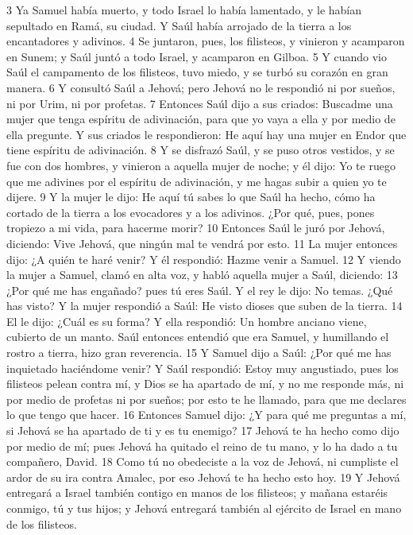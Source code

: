 {3 Ya Samuel había muerto, y todo Israel lo había lamentado, y le habían sepultado en Ramá, su ciudad. Y Saúl había arrojado de la tierra a los encantadores y adivinos. 
4 Se juntaron, pues, los filisteos, y vinieron y acamparon en Sunem; y Saúl juntó a todo Israel, y acamparon en Gilboa.
5 Y cuando vio Saúl el campamento de los filisteos, tuvo miedo, y se turbó su corazón en gran manera.
6 Y consultó Saúl a Jehová; pero Jehová no le respondió ni por sueños, ni por Urim, ni por profetas.
7 Entonces Saúl dijo a sus criados: Buscadme una mujer que tenga espíritu de adivinación, para que yo vaya a ella y por medio de ella pregunte. Y sus criados le respondieron: He aquí hay una mujer en Endor que tiene espíritu de adivinación.
8 Y se disfrazó Saúl, y se puso otros vestidos, y se fue con dos hombres, y vinieron a aquella mujer de noche; y él dijo: Yo te ruego que me adivines por el espíritu de adivinación, y me hagas subir a quien yo te dijere.
9 Y la mujer le dijo: He aquí tú sabes lo que Saúl ha hecho, cómo ha cortado de la tierra a los evocadores y a los adivinos. ¿Por qué, pues, pones tropiezo a mi vida, para hacerme morir?
10 Entonces Saúl le juró por Jehová, diciendo: Vive Jehová, que ningún mal te vendrá por esto.
11 La mujer entonces dijo: ¿A quién te haré venir? Y él respondió: Hazme venir a Samuel.
12 Y viendo la mujer a Samuel, clamó en alta voz, y habló aquella mujer a Saúl, diciendo: 
13 ¿Por qué me has engañado? pues tú eres Saúl. Y el rey le dijo: No temas. ¿Qué has visto? Y la mujer respondió a Saúl: He visto dioses que suben de la tierra.
14 El le dijo: ¿Cuál es su forma? Y ella respondió: Un hombre anciano viene, cubierto de un manto. Saúl entonces entendió que era Samuel, y humillando el rostro a tierra, hizo gran reverencia.
15 Y Samuel dijo a Saúl: ¿Por qué me has inquietado haciéndome venir? Y Saúl respondió: Estoy muy angustiado, pues los filisteos pelean contra mí, y Dios se ha apartado de mí, y no me responde más, ni por medio de profetas ni por sueños; por esto te he llamado, para que me declares lo que tengo que hacer.
16 Entonces Samuel dijo: ¿Y para qué me preguntas a mí, si Jehová se ha apartado de ti y es tu enemigo?
17 Jehová te ha hecho como dijo por medio de mí; pues Jehová ha quitado el reino de tu mano, y lo ha dado a tu compañero, David.
18 Como tú no obedeciste a la voz de Jehová, ni cumpliste el ardor de su ira contra Amalec, por eso Jehová te ha hecho esto hoy. 
19 Y Jehová entregará a Israel también contigo en manos de los filisteos; y mañana estaréis conmigo, tú y tus hijos; y Jehová entregará también al ejército de Israel en mano de los filisteos.
}
